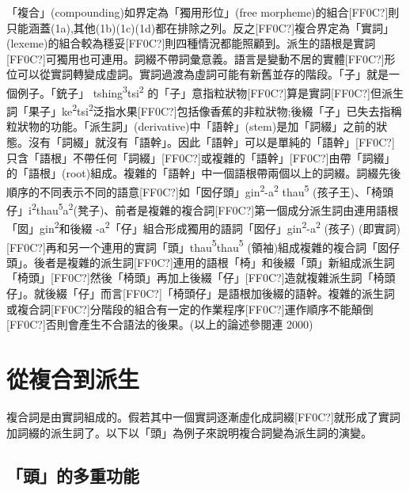 \textrm{「複合」(compounding)如界定為「獨用形位」(free morpheme)的組合[FF0C?]則只能涵蓋(1a),其他(1b)(1c)(1d)都在排除之列。反之[FF0C?]複合界定為「實詞」(lexeme)的組合較為穩妥[FF0C?]則四種情況都能照顧到。派生的語根是實詞[FF0C?]可獨用也可連用。詞綴不帶詞彙意義。語言是變動不居的實體[FF0C?]形位可以從實詞轉變成虛詞。實詞過渡為虛詞可能有新舊並存的階段。「子」就是一個例子。「銃子」 tshing}\textrm{\textsuperscript{3}}\textrm{tsi}\textrm{\textsuperscript{2} }\textrm{的「子」意指粒狀物[FF0C?]算是實詞[FF0C?]但派生詞「果子」ke}\textrm{\textsuperscript{2}}\textrm{tsi}\textrm{\textsuperscript{2}}\textrm{泛指水果[FF0C?]包括像香蕉的非粒狀物;後綴「子」已失去指稱粒狀物的功能。「派生詞」(derivative)中「語幹」(stem)是加「詞綴」之前的狀態。沒有「詞綴」就沒有「語幹」。因此「語幹」可以是單純的「語幹」[FF0C?]只含「語根」不帶任何「詞綴」[FF0C?]或複雜的「語幹」[FF0C?]由帶「詞綴」的「語根」(root)組成。複雜的「語幹」中一個語根帶兩個以上的詞綴。詞綴先後順序的不同表示不同的語意[FF0C?]如「囡仔頭」gin}\textrm{\textsuperscript{2}}\textrm{{}-a}\textrm{\textsuperscript{2}} \textrm{thau}\textrm{\textsuperscript{5}} \textrm{(孩子王)}、\textrm{「椅頭仔」i}\textrm{\textsuperscript{2}}\textrm{thau}\textrm{\textsuperscript{5}}\textrm{a}\textrm{\textsuperscript{2}}\textrm{(凳子)}、\textrm{前者是複雜的複合詞[FF0C?]第一個成分派生詞由連用語根「囡」gin}\textrm{\textsuperscript{2}}\textrm{和後綴 {}-a}\textrm{\textsuperscript{2}}\textrm{「仔」組合形成獨用的語詞「囡仔」gin}\textrm{\textsuperscript{2}}\textrm{{}-a}\textrm{\textsuperscript{2}} \textrm{(孩子) (即實詞)}[FF0C?]\textrm{再和另一个連用的實詞「頭」thau}\textrm{\textsuperscript{5}}\textrm{thau}\textrm{\textsuperscript{5} }\textrm{(領袖)組成複雜的複合詞「囡仔頭」。後者是複雜的派生詞[FF0C?]連用的語根「椅」和後綴「頭」新組成派生詞「椅頭」[FF0C?]然後「椅頭」再加上後綴「仔」[FF0C?]造就複雜派生詞「椅頭仔」。就後綴「仔」而言[FF0C?]「椅頭仔」是語根加後綴的語幹。複雜的派生詞或複合詞[FF0C?]分階段的組合有一定的作業程序[FF0C?]運作順序不能顛倒[FF0C?]否則會產生不合語法的後果。(以上的論述參閱連 2000)}

\section{\rmfamily 從複合到派生}

\textrm{複合詞是由實詞組成的。假若其中一個實詞逐漸虛化成詞綴[FF0C?]就形成了實詞加詞綴的派生詞了。以下以「頭」為例子來說明複合詞變為派生詞的演變。}

\subsection{\rmfamily 「頭」的多重功能}

